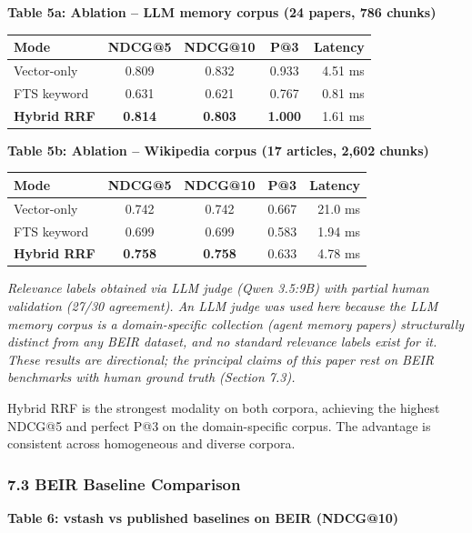 \documentclass[
  11pt]{article}
\newcounter{none} %
\begin{document}
\textbf{Table 5a: Ablation -- LLM memory corpus (24 papers, 786 chunks)}

{\def\LTcaptype{none} %
\begin{longtable}[]{@{}lcccr@{}}
\toprule\noalign{}
Mode & NDCG@5 & NDCG@10 & P@3 & Latency \\
\midrule\noalign{}
\endhead
\bottomrule\noalign{}
\endlastfoot
Vector-only & 0.809 & 0.832 & 0.933 & 4.51 ms \\
FTS keyword & 0.631 & 0.621 & 0.767 & 0.81 ms \\
\textbf{Hybrid RRF} & \textbf{0.814} & \textbf{0.803} & \textbf{1.000} & 1.61 ms \\
\end{longtable}
}

\textbf{Table 5b: Ablation -- Wikipedia corpus (17 articles, 2,602 chunks)}

{\def\LTcaptype{none} %
\begin{longtable}[]{@{}lcccr@{}}
\toprule\noalign{}
Mode & NDCG@5 & NDCG@10 & P@3 & Latency \\
\midrule\noalign{}
\endhead
\bottomrule\noalign{}
\endlastfoot
Vector-only & 0.742 & 0.742 & 0.667 & 21.0 ms \\
FTS keyword & 0.699 & 0.699 & 0.583 & 1.94 ms \\
\textbf{Hybrid RRF} & \textbf{0.758} & \textbf{0.758} & 0.633 & 4.78 ms \\
\end{longtable}
}

\emph{Relevance labels obtained via LLM judge (Qwen 3.5:9B) with partial human validation (27/30 agreement). An LLM judge was used here because the LLM memory corpus is a domain-specific collection (agent memory papers) structurally distinct from any BEIR dataset, and no standard relevance labels exist for it. These results are directional; the principal claims of this paper rest on BEIR benchmarks with human ground truth (Section 7.3).}

Hybrid RRF is the strongest modality on both corpora, achieving the highest NDCG@5 and perfect P@3 on the domain-specific corpus. The advantage is consistent across homogeneous and diverse corpora.

\subsubsection{7.3 BEIR Baseline Comparison}\label{beir-baseline-comparison}

\textbf{Table 6: vstash vs published baselines on BEIR (NDCG@10)}
\end{document}
